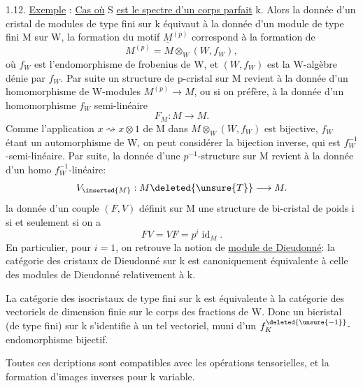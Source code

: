 1.12.  \uline{Exemple} : \uline{Cas où} S \uline{est le spectre d'un corps parfait} k. Alors la donnée d'un cristal de modules de type fini sur k équivaut à la donnée d'un module de type fini M sur W, la formation du motif $\underline M^{(p)}$ correspond à la formation de
\[
M^{(p)}=M\otimes_W(W,f_W),
\]
où $f_W$ est l'endomorphisme de frobenius de W,  et $(W,f_W)$ est la W-algèbre dénie par $f_W$. Par suite un structure de p-cristal sur M revient à la donnée d'un homomorphisme de W-modules $M^{(p)}\longrightarrow M$, ou si on préfère, à la donnée d'un homomorphisme $f_W$\deleted{\unsure{,|-}} semi-linéaire
\[
F_M:M\longrightarrow M.
\]
Comme l'application $x\rightsquigarrow x\otimes1$ de M dans $M\otimes_W(W,f_W)$ est bijective, $f_W$ étant un automorphisme de W, on peut considérer la bijection inverse, qui est $f_W^{-1}$-semi-linéaire. Par suite, la donnée d'une $p^{-1}$-structure sur M revient à la donnée d'un homo $f_W^{-1}$-linéaire:
\[
V_{\inserted{M}}:M\deleted{\unsure{T}}\longrightarrow M.
\]
la donnée d'un couple $(F,V)$ définit sur M une structure de bi-cristal de poids i si et seulement si on a
\[
FV=VF=p^i\operatorname{id}_M.
\]
En particulier, pour $i=1$, on retrouve la notion de \uline{module de Dieudonné}: la catégorie des cristaux de Dieudonné sur k est canoniquement équivalente à celle des modules de Dieudonné  relativement à k.

La catégorie des isocristaux de  type fini sur k est équivalente à la catégorie des vectoriels de dimension finie sur le corps des fractions  de W. Donc un bicristal (de type fini) sur k s'identifie à un tel vectoriel, muni d'un $f_K^{\deleted{\unsure{-1}}}$-endomorphisme bijectif.



Toutes ces dcriptions sont compatibles avec les opérations tensorielles, et la formation d'images inverses pour k variable.

